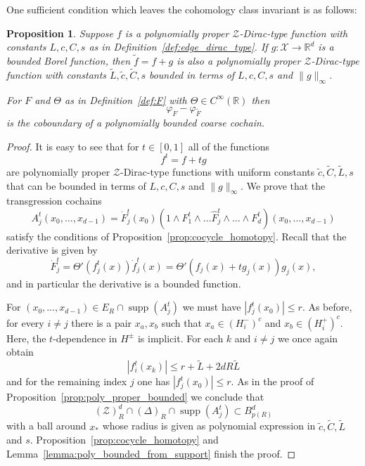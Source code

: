 \documentclass[12pt]{amsart}
\newtheorem{proposition}[theorem]{Proposition}
\newcommand{\RM}{{\mathbb R}}
\newcommand{\Xx}{{\mathcal X}}
\newcommand{\Zz}{{\mathcal Z}}
\DeclareMathOperator{\supp}{supp}
\begin{document}
One sufficient condition which leaves the cohomology class invariant is as follows:
\begin{proposition}
\label{prop:coarse_bounded_perturbation}
Suppose $f$ is a polynomially proper $\Zz$-Dirac-type function with constants $L,c,C,s$ as in Definition~\ref{def:edge_dirac_type}. If $g: \Xx\to \RM^d$ is a bounded Borel function, then $\tilde{f}=f+g$ is also a polynomially proper $\Zz$-Dirac-type function with constants $\tilde{L},\tilde{c},\tilde{C},s$ bounded in terms of $L,c,C,s$ and $\|g\|_\infty$. 

For $F$ and $\Theta$ as in Definition~\ref{def:F} with  $\Theta \in C^{\infty}(\RM)$ then
$$\varphi_{F}-\varphi_{\tilde{F}}$$
is the coboundary of a polynomially bounded coarse cochain.
\end{proposition}
\begin{proof}
It is easy to see that for $t\in [0,1]$ all of the functions
$$f^t = f + t g$$
are polynomially proper $\Zz$-Dirac-type functions with uniform constants $\tilde{c},\tilde{C},\tilde{L},s$ that can be bounded in terms of $L,c,C,s$ and $\|g\|_\infty$.  
We prove that the transgression cochains $$A^t_j(x_0,\dots,x_{d-1}) = \dot{F}^t_j(x_0) (1\wedge F^t_1 \wedge \dots \widehat{F}^t_j \wedge \dots \wedge F^t_d)(x_0,\dots,x_{d-1})$$
satisfy the conditions of Proposition~\ref{prop:cocycle_homotopy}.
Recall that the derivative is given by
\[\dot{F}^t_j = {\Theta'}(f^t_j(x))\dot{f}^t_j(x)= {\Theta'}(f_j(x)+tg_j(x))g_j(x), \]
and in particular the derivative is a bounded function.

For $(x_0,\dots,x_{d-1})\in E_R \cap \supp({A^t_j})$ we must have $|f^t_j(x_0)| \leq r$. 
As before, for every $i\neq j$ there is a pair $x_a,x_b$ such that $x_a\in (H^-_i)^c$ and $x_b \in (H^+_i)^c$. Here, the $t$-dependence in $H^{\pm}$ is implicit.
For each $k$ and $i \neq j$ we once again obtain
$$|f_i^t(x_k)|\leq r + \tilde{L} + 2dR\tilde{L}$$
and for the remaining index $j$ one has $|f^t_j(x_0)| \leq r$. As in the proof of Proposition~\ref{prop:poly_proper_bounded} we conclude that
$$(\Zz)_R^d \cap (\Delta)_R \cap \supp (A^t_j) \subset B_{p(R)}^{d}$$
with a ball around $x_*$ whose radius is given as polynomial expression in $\tilde{c},\tilde{C},\tilde{L}$ and $s$. Proposition~\ref{prop:cocycle_homotopy} and Lemma~\ref{lemma:poly_bounded_from_support} finish the proof.
\end{proof}
\end{document}

